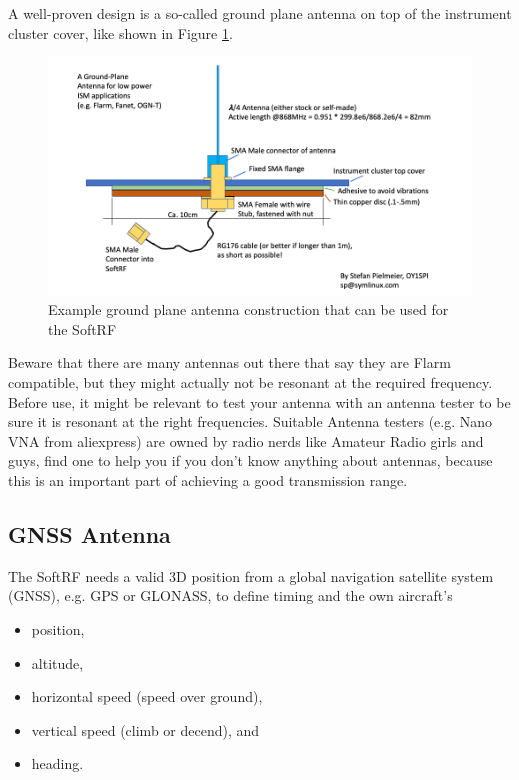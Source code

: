 \documentclass[11pt,a4paper]{article}
\begin{document}
A well-proven design is a so-called ground plane antenna on top of the instrument cluster cover, like shown in Figure \ref{groundplane}.

\begin{figure}[h]
\includegraphics[scale=.5]{gp-antenna.png}
\caption{Example ground plane antenna construction that can be used for the SoftRF}\label{groundplane}
\end{figure}\FloatBarrier

Beware that there are many antennas out there that say they are Flarm compatible, but they might actually not be resonant at the required frequency. Before use, it might be relevant to test your antenna with an antenna tester to be sure it is resonant at the right frequencies. Suitable Antenna testers (e.g. Nano VNA from aliexpress) are owned by radio nerds like Amateur Radio girls and guys, find one to help you if you don't know anything about antennas, because this is an important part of achieving a good transmission range.

\subsection{GNSS Antenna}
The SoftRF needs a valid 3D position from a global navigation satellite system (GNSS), e.g. GPS or GLONASS, to define timing and the own aircraft's

\begin{itemize}
\item position,
\item altitude,
\item horizontal speed (speed over ground),
\item vertical speed (climb or decend), and
\item heading.
\end{itemize}
\end{document}
